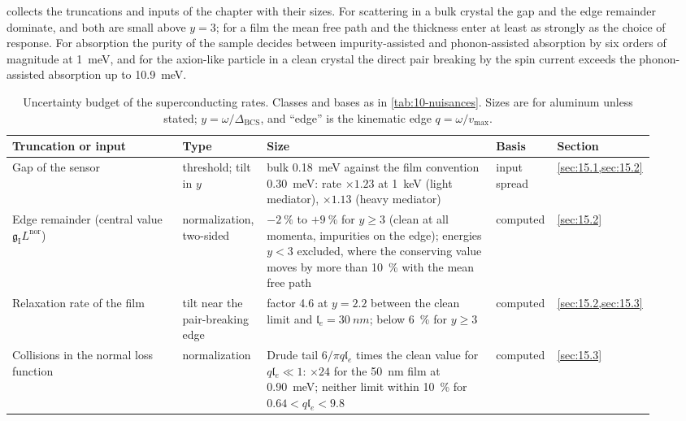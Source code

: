  collects the truncations and inputs of the chapter with their sizes. For scattering in a bulk crystal the gap and the edge remainder dominate, and both are small above $y = 3$; for a film the mean free path and the thickness enter at least as strongly as the choice of response. For absorption the purity of the sample decides between impurity-assisted and phonon-assisted absorption by six orders of magnitude at \SI{1}{meV}, and for the axion-like particle in a clean crystal the direct pair breaking by the spin current exceeds the phonon-assisted absorption up to \SI{10.9}{meV}.
\begin{table}[tbp]
  \caption{Uncertainty budget of the superconducting rates. Classes and bases as in \cref{tab:10-nuisances}. Sizes are for aluminum unless stated; $y = \omega/\Delta_{\mathrm{BCS}}$, and ``edge'' is the kinematic edge $q = \omega/v_{\mathrm{max}}$.}
  \label{tab:15-nuisances}
  \centering\scriptsize\setlength{\tabcolsep}{3pt}
  \begin{tabular}{@{}>{\raggedright\arraybackslash}p{0.26\linewidth}>{\raggedright\arraybackslash}p{0.12\linewidth}>{\raggedright\arraybackslash}p{0.35\linewidth}>{\raggedright\arraybackslash}p{0.09\linewidth}>{\raggedright\arraybackslash}p{0.10\linewidth}@{}}
    \toprule
    Truncation or input & Type & Size & Basis & Section \\
    \midrule
    Gap of the sensor & threshold; tilt in $y$ & bulk \SI{0.18}{meV} against the film convention \SI{0.30}{meV}: rate $\times1.23$ at \SI{1}{keV} (light mediator), $\times1.13$ (heavy mediator) & input spread & \cref{sec:15.1,sec:15.2} \\
    Edge remainder (central value $\mathfrak{g}_{\mathrm{I}}L^{\mathrm{nor}}$) & normali\-zation, two-sided & $-\SI{2}{\percent}$ to $+\SI{9}{\percent}$ for $y \ge 3$ (clean at all momenta, impurities on the edge); energies $y < 3$ excluded, where the conserving value moves by more than \SI{10}{\percent} with the mean free path & computed & \cref{sec:15.2} \\
    Relaxation rate of the film & tilt near the pair-breaking edge & factor 4.6 at $y = 2.2$ between the clean limit and $\mathfrak{l}_e = \SI{30}{nm}$; below \SI{6}{\percent} for $y \ge 3$ & computed & \cref{sec:15.2,sec:15.3} \\
    Collisions in the normal loss function & normali\-zation & Drude tail $6/\pi q\mathfrak{l}_e$ times the clean value for $q\mathfrak{l}_e \ll 1$: $\times24$ for the \SI{50}{nm} film at \SI{0.90}{meV}; neither limit within \SI{10}{\percent} for $0.64 < q\mathfrak{l}_e < 9.8$ & computed & \cref{sec:15.3} \\

\end{tabular}
\end{table}
